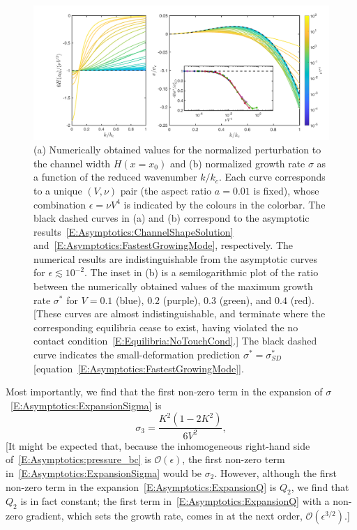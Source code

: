 \documentclass{jfm}
\newcommand{\order}[1]{\mathcal{O}\left(#1\right)}
\begin{document}
\begin{figure}
\centering
\includegraphics[width = \textwidth]{figures/fig8_asymptotics.pdf}
\caption{(a) Numerically obtained values for the normalized perturbation to the channel width $H(x = x_0)$ and (b) normalized growth rate $\sigma$ as a function of the reduced wavenumber $k/k_c$. Each curve corresponds to a unique $(V,\nu)$ pair (the aspect ratio $a = 0.01$ is fixed), whose combination $\epsilon = \nu V^4$ is indicated by the colours in the colorbar. The black dashed curves in (a) and (b) correspond to the asymptotic results~\eqref{E:Asymptotics:ChannelShapeSolution} and~\eqref{E:Asymptotics:FastestGrowingMode}, respectively. The numerical results are indistinguishable from the asymptotic curves for $\epsilon \lesssim 10^{-2}$. The inset in (b) is a semilogarithmic plot of the ratio between the numerically obtained values of the maximum growth rate $\sigma^*$ for $V = 0.1$ (blue), $0.2$ (purple), $0.3$ (green), and $0.4$ (red). [These curves are almost indistinguishable, and terminate where the corresponding equilibria cease to exist, having violated the no contact condition~\eqref{E:Equilibria:NoTouchCond}.] The black dashed curve indicates the small-deformation prediction $\sigma^* = \sigma^*_{SD}$ [equation~\eqref{E:Asymptotics:FastestGrowingMode}].}
\label{fig:CollapsedGrowthRates}
\end{figure}


Most importantly, we find that the first non-zero term in the expansion of $\sigma$~\eqref{E:Asymptotics:ExpansionSigma} is
\begin{equation}\label{E:Asymptotics:LeadingOrderSigma}
\sigma_{3} = \frac{K^2\left(1-2K^2\right)}{6V^2},
\end{equation}
[It might be expected that, because the inhomogeneous right-hand side of~\eqref{E:Asymptotics:pressure_bc} is $\order{\epsilon}$, the first non-zero term in~\eqref{E:Asymptotics:ExpansionSigma} would be $\sigma_2$. However, although 
the first non-zero term in the expansion~\eqref{E:Asymptotics:ExpansionQ} is $Q_{2}$, we find that $Q_{2}$ is in fact constant; the first term in~\eqref{E:Asymptotics:ExpansionQ} with a non-zero gradient, which sets the growth rate, comes in at the next order, $\mathcal{O}(\epsilon^{3/2})$.]
\end{document}
